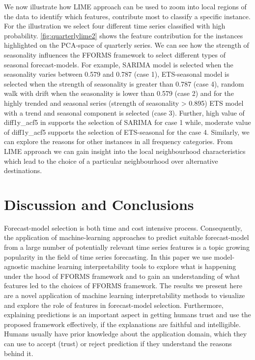 \documentclass[11pt,a4paper,]{article}
\begin{document}
We now illustrate how LIME approach can be used to zoom into local
regions of the data to identify which features, contribute most to
classify a specific instance. For the illustration we select four
different time series classified with high probability.
\autoref{fig:quarterlylime2} shows the feature contribution for the
instances highlighted on the PCA-space of quarterly series. We can see
how the strength of seasonality influences the FFORMS framework to
select different types of seasonal forecast-models. For example, SARIMA
model is selected when the seasonality varies between 0.579 and 0.787
(case 1), ETS-seasonal model is selected when the strength of
seasonality is greater than 0.787 (case 4), random walk with drift when
the seasonality is lower than 0.579 (case 2) and for the highly trended
and seasonal series (strength of seasonality \textgreater{} 0.895) ETS
model with a trend and seasonal component is selected (case 3). Further,
high value of diff1y\_acf5 in supports the selection of SARIMA for case
1 while, moderate value of diff1y\_acf5 supports the selection of
ETS-seasonal for the case 4. Similarly, we can explore the reasons for
other instances in all frequency categories. From LIME approach we can
gain insight into the local neighbourhood characteristics which lead to
the choice of a particular neighbourhood over alternative destinations.

\section{Discussion and Conclusions}\label{conclusions}

Forecast-model selection is both time and cost intensive process.
Consequently, the application of machine-learning approaches to predict
suitable forecast-model from a large number of potentially relevant time
series features is a topic growing popularity in the field of time
series forecasting. In this paper we use model-agnostic machine learning
interpretability tools to explore what is happening under the hood of
FFORMS framework and to gain an understanding of what features led to
the choices of FFORMS framework. The results we present here are a novel
application of machine learning interpretability methods to visualize
and explore the role of features in forecast-model selection.
Furthermore, explaining predictions is an important aspect in getting
humans trust and use the proposed framework effectively, if the
explanations are faithful and intelligible. Humans usually have prior
knowledge about the application domain, which they can use to accept
(trust) or reject prediction if they understand the reasons behind it.
\end{document}

